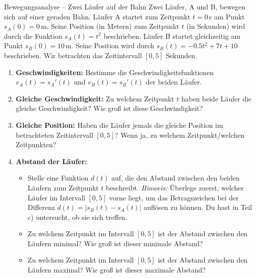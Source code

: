 \begin{aufgabenumgebung}{Bewegungsanalyse – Zwei Läufer auf der Bahn}
Zwei Läufer, A und B, bewegen sich auf einer geraden Bahn.
Läufer A startet zum Zeitpunkt $t=0\,$s am Punkt $s_A(0)=0\,$m. Seine Position (in Metern) zum Zeitpunkt $t$ (in Sekunden) wird durch die Funktion $s_A(t) = t^2$ beschrieben.
Läufer B startet gleichzeitig am Punkt $s_B(0)=10\,$m. Seine Position wird durch $s_B(t) = -0.5t^2 + 7t + 10$ beschrieben.
Wir betrachten das Zeitintervall $[0, 5]$ Sekunden.

\begin{enumerate}
    \item \textbf{Geschwindigkeiten:} Bestimme die Geschwindigkeitsfunktionen $v_A(t) = s_A'(t)$ und $v_B(t) = s_B'(t)$ der beiden Läufer.
    \item \textbf{Gleiche Geschwindigkeit:} Zu welchem Zeitpunkt $t$ haben beide Läufer die gleiche Geschwindigkeit? Wie groß ist diese Geschwindigkeit?
    \item \textbf{Gleiche Position:} Haben die Läufer jemals die gleiche Position im betrachteten Zeitintervall $[0,5]$? Wenn ja, zu welchem Zeitpunkt/welchen Zeitpunkten?
    \item \textbf{Abstand der Läufer:}
        \begin{itemize}
            \item Stelle eine Funktion $d(t)$ auf, die den Abstand zwischen den beiden Läufern zum Zeitpunkt $t$ beschreibt. 
            \textit{Hinweis:} Überlege zuerst, welcher Läufer im Intervall $[0,5]$ vorne liegt, um das Betragszeichen bei der Differenz $d(t) = |s_B(t) - s_A(t)|$ auflösen zu können. Du hast in Teil c) untersucht, ob sie sich treffen.
            \item Zu welchem Zeitpunkt im Intervall $[0,5]$ ist der Abstand zwischen den Läufern minimal? Wie groß ist dieser minimale Abstand?
            \item Zu welchem Zeitpunkt im Intervall $[0,5]$ ist der Abstand zwischen den Läufern maximal? Wie groß ist dieser maximale Abstand?
        \end{itemize}
\end{enumerate}
\end{aufgabenumgebung}



